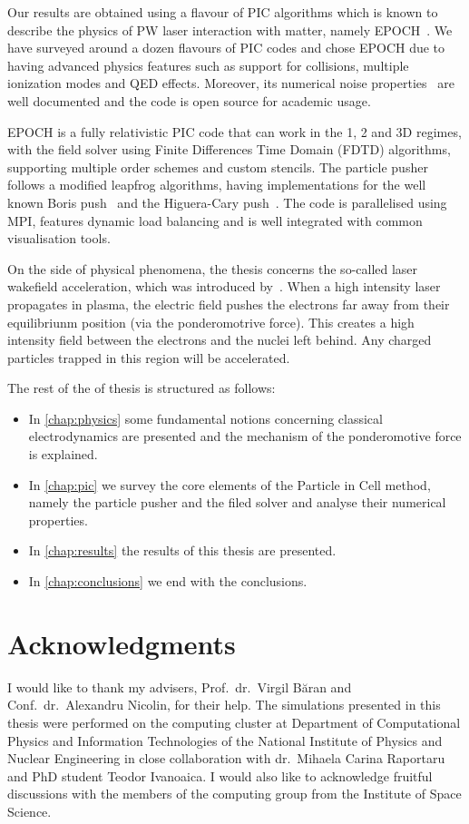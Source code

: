 \documentclass[12pt, class=report, crop=false]{standalone}
\begin{document}
Our results are obtained using a flavour of PIC algorithms which is known
to describe the physics of PW laser interaction with matter, namely
EPOCH~\autocite{arber_contemporaryparticleincell_2015}. We have surveyed around
a dozen flavours of PIC codes and chose EPOCH due to having advanced physics
features such as support for collisions, multiple ionization modes and QED
effects. Moreover, its numerical noise properties~\autocite{arber_contemporaryparticleincell_2015}
are well documented and the code is open source for academic usage.

EPOCH is a fully relativistic PIC code that can work in the 1, 2 and 3D regimes,
with the field solver using Finite Differences Time Domain (FDTD) algorithms,
supporting multiple order schemes and custom stencils. The particle pusher follows
a modified leapfrog algorithms, having implementations for the well known
Boris push~\autocite{boris_relativisticplasma_1970} and the Higuera-Cary
push~\autocite{higuera_structurepreservingsecondorder_2017}. The code is parallelised
using MPI, features dynamic load balancing and is well integrated with common
visualisation tools.

On the side of physical phenomena, the thesis concerns the so-called laser wakefield
acceleration, which was introduced by~\textcite{tajima_laserelectron_1979}.
When a high intensity laser propagates in plasma, the electric field pushes the
electrons far away from their equilibriunm position (via the ponderomotrive
force). This creates a high intensity field between the electrons
and the nuclei left behind. Any charged particles trapped
in this region will be accelerated.

The rest of the of thesis is structured as follows:
\begin{itemize}
    \item In \cref{chap:physics} some fundamental notions concerning classical
    electrodynamics are presented and the mechanism of the ponderomotive force
    is explained.
    \item In \cref{chap:pic} we survey the core elements of the Particle in Cell
    method, namely the particle pusher and the filed solver and analyse their
    numerical properties.
    \item In \cref{chap:results} the results of this thesis are presented.
    \item In \cref{chap:conclusions} we end with the conclusions.
\end{itemize}

\section*{Acknowledgments}
I would like to thank my advisers, Prof.~dr.~Virgil Băran and Conf.~dr.~Alexandru Nicolin,
for their help. The simulations presented in this thesis were performed on the
computing cluster at Department of Computational Physics and Information
Technologies of the National Institute of Physics and Nuclear Engineering
in close collaboration with dr.~Mihaela Carina Raportaru and PhD student
Teodor Ivanoaica. I would also like to acknowledge fruitful discussions with
the members of the computing group from the Institute of Space Science.
\end{document}
